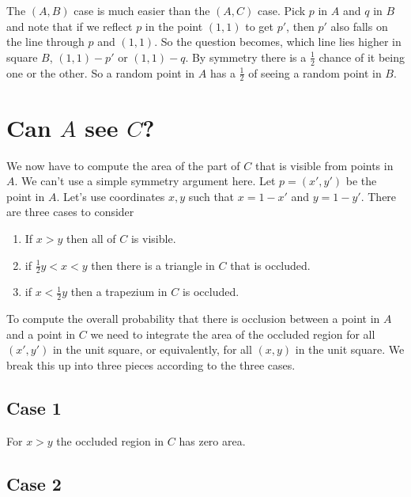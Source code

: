 \documentclass[12pt]{article}
\begin{document}
\begin{center}
\end{center}

The $(A,B)$ case is much easier than the $(A,C)$ case.
Pick $p$ in $A$ and $q$ in $B$ and note that if we reflect $p$ in the point $(1,1)$ to get $p'$, then $p'$ also falls on the line through $p$ and $(1,1)$.
So the question becomes, which line lies higher in square $B$, $(1,1)-p'$ or $(1,1)-q$.
By symmetry there is a $\frac{1}{2}$ chance of it being one or the other.
So a random point in $A$ has a $\frac{1}{2}$ of seeing a random point in $B$.

\section{Can $A$ see $C$?}

We now have to compute the area of the part of $C$ that is visible from points in $A$.
We can't use a simple symmetry argument here.
Let $p=(x',y')$ be the point in $A$.
Let's use coordinates $x, y$ such that $x=1-x'$ and $y=1-y'$.
There are three cases to consider
\begin{enumerate}
\item If $x>y$ then all of $C$ is visible.
\item if $\frac{1}{2}y<x<y$ then there is a triangle in $C$ that is occluded.
\item if $x<\frac{1}{2}y$ then a trapezium in $C$ is occluded.
\end{enumerate}
To compute the overall probability that there is occlusion between a point in $A$ and a point in $C$ we need to integrate the area of the occluded region for all $(x',y')$ in the unit square, or equivalently, for all $(x,y)$ in the unit square.
We break this up into three pieces according to the three cases.

\subsection{Case 1}
For $x>y$ the occluded region in $C$ has zero area.

\subsection{Case 2}
\begin{center}
\end{center}
\end{document}
